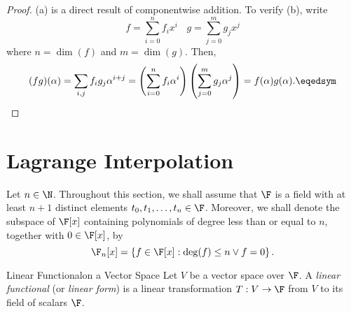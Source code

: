 \documentclass[linearalgebra]{subfiles}
\begin{document}
    \begin{proof}
        (a) is a direct result of componentwise addition. To verify (b), write
        \begin{equation*}
            f = \sum^n_{i=0} f_ix^i \ \ \ \ g = \sum^m_{j=0} g_jx^j
        \end{equation*}
        where $n = \dim(f)$ and $m = \dim(g)$. Then,
        \begin{equation*}
            (fg)(\alpha) = \sum_{i,j} f_ig_j\alpha^{i+j} = \left( \sum^n_{i=0} f_i\alpha^i \right)\left( \sum^m_{j=0} g_j\alpha^j \right) = f(\alpha)g(\alpha). \eqedsym
        \end{equation*}
    \end{proof}

    \section{Lagrange Interpolation}

    \begin{remark}
        Let $n\in\N$. Throughout this section, we shall assume that $\F$ is a field with at least $n+1$ distinct elements $t_0,t_1,\ldots,t_n\in\F$. Moreover, we shall denote the subspace of $\F[x]$ containing polynomials of degree less than or equal to $n$, together with $0\in\F[x]$, by
        \begin{equation*}
            \F_n[x] = \left\lbrace f\in\F[x]:\deg(f)\leq n\lor f=0 \right\rbrace.
        \end{equation*}
    \end{remark}

    \begin{recall}{Linear Functional}{on a Vector Space}
        Let $V$ be a vector space over $\F$. A \emph{linear functional} (or \emph{linear form}) is a linear transformation $T:V\to \F$ from $V$ to its field of scalars $\F$.
    \end{recall}
\end{document}
